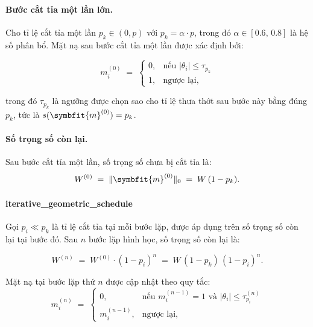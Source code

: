\paragraph{\textbf{Bước cắt tỉa một lần lớn.}}
Cho tỉ lệ cắt tỉa một lần $p_k \in (0, p)$ với $p_k = \alpha \cdot p$, trong đó $\alpha \in [0.6,\, 0.8]$ là hệ số phân bổ.
Mặt nạ sau bước cắt tỉa một lần được xác định bởi:

\begin{equation}
    m_i^{(0)} \;=\;
    \begin{cases}
        0, & \text{nếu } |\theta_i| \leq \tau_{p_k} \\
        1, & \text{ngược lại,}
    \end{cases}
    \label{eq:oneshot-mask}
\end{equation}

trong đó $\tau_{p_k}$ là ngưỡng được chọn sao cho tỉ lệ thưa thớt sau bước này bằng đúng $p_k$, tức là $s(\symbfit{m}^{(0)}) = p_k$.

\paragraph{\textbf{Số trọng số còn lại.}\cite{hybrid}}
Sau bước cắt tỉa một lần, số trọng số chưa bị cắt tỉa là:
\begin{equation}
    W^{(0)} \;=\; \|\symbfit{m}^{(0)}\|_0 \;=\; W\,(1 - p_k).
    \label{eq:remaining-after-oneshot}
\end{equation}

\paragraph{\textbf{\gls{iterative_geometric_schedule}}}\cite{hybrid}
Gọi $p_i \ll p_k$ là tỉ lệ cắt tỉa tại mỗi bước lặp, được áp dụng trên số trọng số còn lại tại bước đó.
Sau $n$ bước lặp hình học, số trọng số còn lại là:

\begin{equation}
    W^{(n)} \;=\; W^{(0)} \cdot (1 - p_i)^{n}
    \;=\; W\,(1 - p_k)\,(1 - p_i)^{n}.
    \label{eq:geom-remaining}
\end{equation}

Mặt nạ tại bước lặp thứ $n$ được cập nhật theo quy tắc:
\begin{equation}
    m_i^{(n)} \;=\;
    \begin{cases}
        0,           & \text{nếu } m_i^{(n-1)} = 1 \text{ và }
        |\theta_i| \leq \tau_{p_i}^{(n)}                       \\
        m_i^{(n-1)}, & \text{ngược lại,}
    \end{cases}
    \label{eq:iter-mask}
\end{equation}

